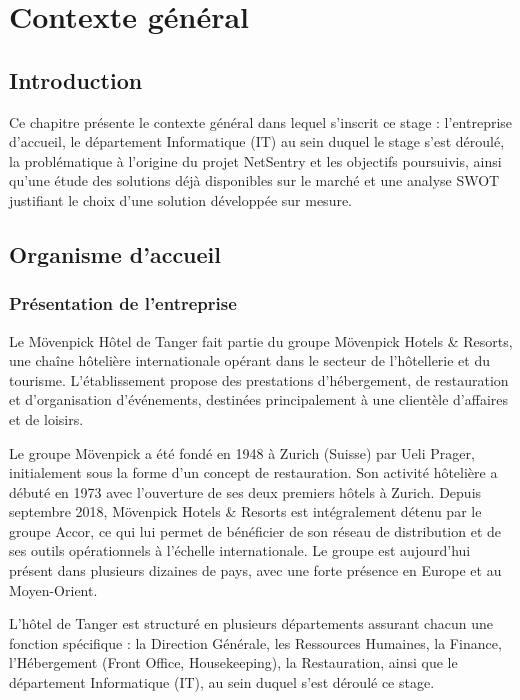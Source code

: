 \chapter{Contexte général}
\label{chap:contexte}

\section{Introduction}

Ce chapitre présente le contexte général dans lequel s'inscrit ce stage : l'entreprise
d'accueil, le département Informatique (IT) au sein duquel le stage s'est déroulé, la
problématique à l'origine du projet NetSentry et les objectifs poursuivis, ainsi qu'une
étude des solutions déjà disponibles sur le marché et une analyse SWOT justifiant le
choix d'une solution développée sur mesure.

\section{Organisme d'accueil}

\subsection{Présentation de l'entreprise}

Le Mövenpick Hôtel de Tanger fait partie du groupe Mövenpick Hotels \& Resorts, une
chaîne hôtelière internationale opérant dans le secteur de l'hôtellerie et du tourisme.
L'établissement propose des prestations d'hébergement, de restauration et
d'organisation d'événements, destinées principalement à une clientèle d'affaires et de
loisirs.

Le groupe Mövenpick a été fondé en 1948 à Zurich (Suisse) par Ueli Prager, initialement
sous la forme d'un concept de restauration. Son activité hôtelière a débuté en 1973 avec
l'ouverture de ses deux premiers hôtels à Zurich. Depuis septembre 2018, Mövenpick
Hotels \& Resorts est intégralement détenu par le groupe Accor, ce qui lui permet de
bénéficier de son réseau de distribution et de ses outils opérationnels à l'échelle
internationale. Le groupe est aujourd'hui présent dans plusieurs dizaines de pays, avec
une forte présence en Europe et au Moyen-Orient.

L'hôtel de Tanger est structuré en plusieurs départements assurant chacun une fonction
spécifique : la Direction Générale, les Ressources Humaines, la Finance, l'Hébergement
(Front Office, Housekeeping), la Restauration, ainsi que le département Informatique
(IT), au sein duquel s'est déroulé ce stage.

